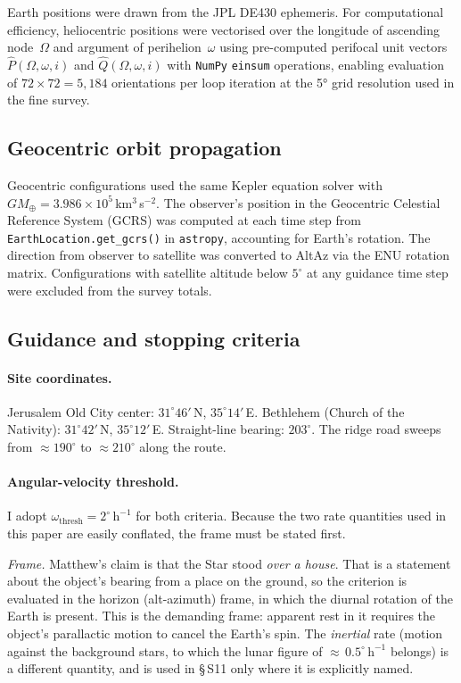 \documentclass[11pt,a4paper]{article}
\begin{document}
Earth positions were drawn from the JPL DE430 ephemeris. For computational
efficiency, heliocentric positions were vectorised over the longitude of
ascending node~$\Omega$ and argument of perihelion~$\omega$ using
pre-computed perifocal unit vectors $\hat{P}(\Omega,\omega,i)$ and
$\hat{Q}(\Omega,\omega,i)$ with \texttt{NumPy} \texttt{einsum} operations,
enabling evaluation of $72\times72 = 5{,}184$ orientations per loop iteration
at the 5° grid resolution used in the fine survey.

\subsection{Geocentric orbit propagation}

Geocentric configurations used the same Kepler equation solver with
$GM_\oplus = 3.986\times10^5$\,km$^3$\,s$^{-2}$. The observer's position
in the Geocentric Celestial Reference System (GCRS) was computed at each
time step from \texttt{EarthLocation.get\_gcrs()} in \texttt{astropy},
accounting for Earth's rotation. The direction from observer to satellite
was converted to AltAz via the ENU rotation matrix. Configurations with
satellite altitude below $5^\circ$ at any guidance time step were excluded
from the survey totals.

\subsection{Guidance and stopping criteria}

\paragraph{Site coordinates.}
Jerusalem Old City center: $31^\circ 46'$\,N, $35^\circ 14'$\,E.
Bethlehem (Church of the Nativity): $31^\circ 42'$\,N, $35^\circ 12'$\,E.
Straight-line bearing: $203^\circ$. The ridge road sweeps from
$\approx 190^\circ$ to $\approx 210^\circ$ along the route.

\paragraph{Angular-velocity threshold.}
I adopt $\omega_\mathrm{thresh} = 2^\circ\,\mathrm{h}^{-1}$ for both criteria.
Because the two rate quantities used in this paper are easily conflated, the
frame must be stated first.

\textit{Frame.} Matthew's claim is that the Star stood \emph{over a house}.
That is a statement about the object's bearing from a place on the ground, so
the criterion is evaluated in the horizon (alt-azimuth) frame, in which the
diurnal rotation of the Earth is present. This is the demanding frame: apparent
rest in it requires the object's parallactic motion to cancel the Earth's spin.
The \emph{inertial} rate (motion against the background stars, to which the
lunar figure of ${\approx}\,0.5^\circ\,\mathrm{h}^{-1}$ belongs) is a different
quantity, and is used in §\,S11 only where it is explicitly named.
\end{document}
